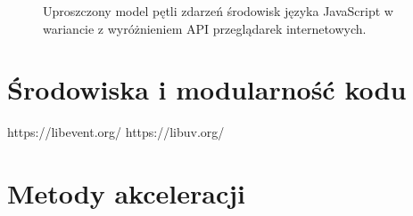 \begin{figure}
    \centering
    
    \caption{Uproszczony model pętli zdarzeń środowisk języka JavaScript w wariancie z wyróżnieniem API przeglądarek internetowych.}
    \label{fig:event-loop}
\end{figure}

\section{Środowiska i modularność kodu}
\label{sec:env-modules}


https://libevent.org/
https://libuv.org/

\section{Metody akceleracji}
\label{sec:acc-methods}


